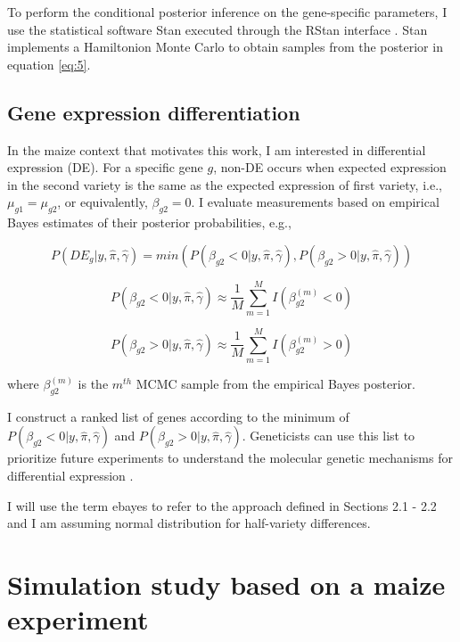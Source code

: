 \documentclass[11pt]{isuthesis}
\begin{document}
To perform the conditional posterior inference on the gene-specific parameters, I use the statistical software Stan \citep{stan2014stan} executed through the RStan interface \citep{team2016rstan}. Stan implements a Hamiltonion Monte Carlo \citep{neal2011mcmc} to obtain samples from the posterior in equation \ref{eq:5}. 


\subsection{Gene expression differentiation}

In the maize context that motivates this work, I am interested in differential expression (DE). For a specific gene $g$, non-DE occurs when expected expression in the second variety is the same as the expected expression of first variety, i.e., $\mu_{g1} = \mu_{g2}$, or equivalently, $\beta_{g2}=0$.  I evaluate measurements based on empirical Bayes estimates of their posterior probabilities, e.g., 

\begin{equation}
\label{eq:6}
P(DE_g | y, \hat{\pi}, \hat{\gamma}) =min( P(\beta_{g2}< 0 | y, \hat{\pi}, \hat{\gamma}),  P(\beta_{g2}> 0 | y, \hat{\pi}, \hat{\gamma}))
\end{equation}

$$P(\beta_{g2}< 0 | y, \hat{\pi}, \hat{\gamma}) \approx \frac{1}{M} \sum_{m=1}^M I(\beta_{g2} ^ {(m)} < 0)$$

$$P(\beta_{g2}> 0 | y, \hat{\pi}, \hat{\gamma}) \approx \frac{1}{M} \sum_{m=1}^M I(\beta_{g2} ^ {(m)} > 0) $$

where $\beta_{g2}^{(m)}$ is the $m^{th}$ MCMC sample from the empirical Bayes posterior.



I construct a ranked list of genes according to the minimum of $P(\beta_{g2}< 0 | y, \hat{\pi}, \hat{\gamma})$ and $P(\beta_{g2}> 0 | y, \hat{\pi}, \hat{\gamma})$. Geneticists can use this list to prioritize future experiments to understand the molecular genetic mechanisms for differential expression \citep{niemi2015empirical}. 

I will use the term ebayes to refer to the approach defined in Sections 2.1 - 2.2 and I am assuming normal distribution for half-variety differences.


\section{Simulation study based on a maize experiment}
\end{document}
